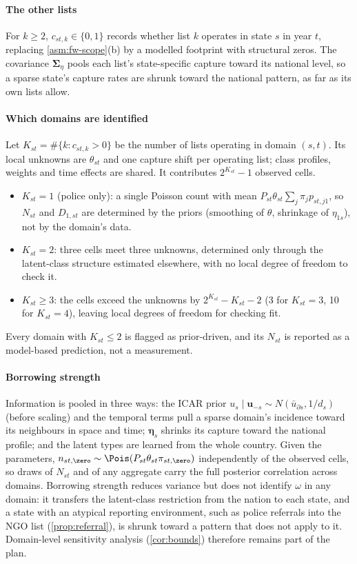 \paragraph{The other lists} For $k\ge2$, $c_{st,k}\in\{0,1\}$ records whether list $k$ operates in state $s$ in year $t$, replacing \cref{asm:fw-scope}(b) by a modelled footprint with structural zeros. The covariance $\bm\Sigma_\eta$ pools each list's state-specific capture toward its national level, so a sparse state's capture rates are shrunk toward the national pattern, as far as its own lists allow.

\paragraph{Which domains are identified} Let $K_{st}=\#\{k:c_{st,k}>0\}$ be the number of lists operating in domain $(s,t)$. Its local unknowns are $\theta_{st}$ and one capture shift per operating list; class profiles, weights and time effects are shared. It contributes $2^{K_{st}}-1$ observed cells.
\begin{itemize}
  \item $K_{st}=1$ (police only): a single Poisson count with mean $P_{st}\theta_{st}\sum_j\pi_jp_{st,j1}$, so $N_{st}$ and $D_{1,st}$ are determined by the priors (smoothing of $\theta$, shrinkage of $\eta_{1s}$), not by the domain's data.
  \item $K_{st}=2$: three cells meet three unknowns, determined only through the latent-class structure estimated elsewhere, with no local degree of freedom to check it.
  \item $K_{st}\ge3$: the cells exceed the unknowns by $2^{K_{st}}-K_{st}-2$ (3 for $K_{st}=3$, 10 for $K_{st}=4$), leaving local degrees of freedom for checking fit.
\end{itemize}
Every domain with $K_{st}\le2$ is flagged as prior-driven, and its $N_{st}$ is reported as a model-based prediction, not a measurement.

\paragraph{Borrowing strength} Information is pooled in three ways: the ICAR prior $u_s\mid\bm u_{-s}\sim N(\bar u_{\partial s},1/d_s)$ (before scaling) and the temporal terms pull a sparse domain's incidence toward its neighbours in space and time; $\bm\eta_s$ shrinks its capture toward the national profile; and the latent types are learned from the whole country. Given the parameters, $n_{st,\zero}\sim\Pois(P_{st}\theta_{st}\pi_{st,\zero})$ independently of the observed cells, so draws of $N_{st}$ and of any aggregate carry the full posterior correlation across domains. Borrowing strength reduces variance but does not identify $\omega$ in any domain: it transfers the latent-class restriction from the nation to each state, and a state with an atypical reporting environment, such as police referrals into the NGO list (\cref{prop:referral}), is shrunk toward a pattern that does not apply to it. Domain-level sensitivity analysis (\cref{cor:bounds}) therefore remains part of the plan.

